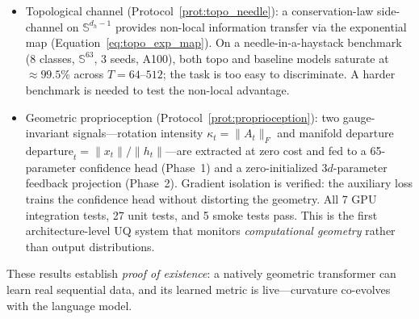 \documentclass[11pt,a4paper]{article}
\theoremstyle{definition}
\theoremstyle{remark}
\newcommand{\Sphere}{\mathbb{S}}
\begin{document}
\begin{itemize}[nosep]
    comparative ratio is confounded 
    (Section~\ref{sec:baseline_audit}). Marcella's absolute 
    perplexity ($1.05$) stands.
    \item Topological channel 
    (Protocol~\ref{prot:topo_needle}): a conservation-law 
    side-channel on $\Sphere^{d_h - 1}$ provides non-local 
    information transfer via the exponential map 
    (Equation~\ref{eq:topo_exp_map}). On a needle-in-a-haystack 
    benchmark (8 classes, $\Sphere^{63}$, 3 seeds, A100), both 
    topo and baseline models saturate at ${\approx}99.5\%$ across 
    $T = 64$--$512$; the task is too easy to discriminate. A 
    harder benchmark is needed to test the non-local advantage.
    \item Geometric proprioception 
    (Protocol~\ref{prot:proprioception}): two gauge-invariant 
    signals---rotation intensity $\kappa_t = \|A_t\|_F$ and 
    manifold departure $\mathrm{departure}_t = \|x_t\|/\|h_t\|$---are 
    extracted at zero cost and fed to a 65-parameter confidence 
    head (Phase~1) and a zero-initialized $3d$-parameter feedback 
    projection (Phase~2). Gradient isolation is verified: the 
    auxiliary loss trains the confidence head without distorting 
    the geometry. All 7 GPU integration tests, 27 unit tests, and 
    5 smoke tests pass. This is the first architecture-level UQ 
    system that monitors \emph{computational geometry} rather than 
    output distributions.
\end{itemize}

These results establish \emph{proof of existence}: a natively 
geometric transformer can learn real sequential data, and its 
learned metric is live---curvature co-evolves with the language 
model.

\medskip
\end{document}

